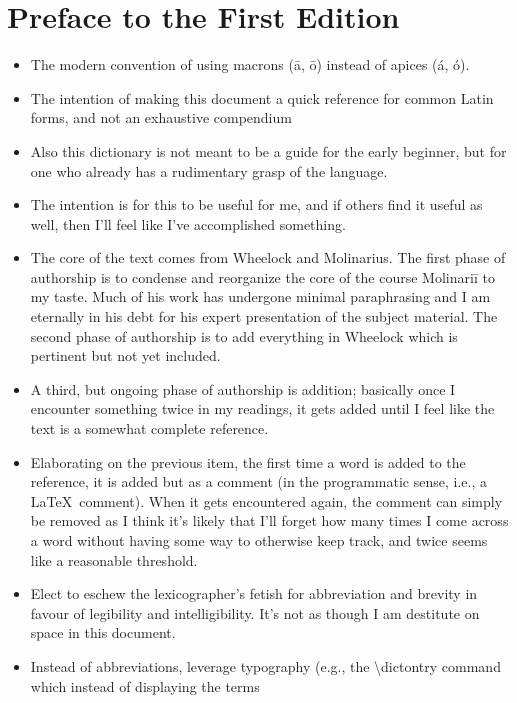 \section*{Preface to the First Edition}

\begin{itemize}
  \item The modern convention of using macrons (\=a, \=o)
    instead of apices (\'a, \'o).
  \item The intention of making this document a quick reference
    for common Latin forms, and not an exhaustive compendium
  \item Also this dictionary is not meant to be a guide for the
    early beginner, but for one who already has a rudimentary
    grasp of the language.
  \item The intention is for this to be useful for me, and if others
    find it useful as well, then I'll feel like I've accomplished
    something.
  \item The core of the text comes from Wheelock and Molinarius.
    The first phase of authorship is to condense and reorganize
    the core of the course Molinari\=i to my taste.  Much of his
    work has undergone minimal paraphrasing and I am eternally in
    his debt for his expert presentation of the subject material.
    The second phase of authorship is to add everything in 
    Wheelock which is pertinent but not yet included.
  \item A third, but ongoing phase of authorship is addition;
    basically once I encounter something twice in my readings,
    it gets added until I feel like the text is a somewhat
    complete reference.
  \item Elaborating on the previous item, the first time a word
    is added to the reference, it is added but as a comment
    (in the programmatic sense, i.e., a \LaTeX~comment).  When
    it gets encountered again, the comment can simply be removed
    as I think it's likely that I'll forget how many times I come
    across a word without having some way to otherwise keep track,
    and twice seems like a reasonable threshold.
  \item Elect to eschew the lexicographer's fetish for abbreviation
    and brevity in favour of legibility and intelligibility.  It's
    not as though I am destitute on space in this document.
  \item Instead of abbreviations, leverage typography (e.g., the
    \textbackslash dictontry command which instead of displaying the terms

\end{itemize}
